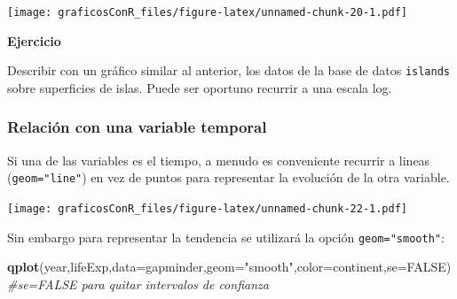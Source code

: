 \documentclass[]{article}
\newenvironment{Shaded}{\begin{snugshade}}{\end{snugshade}}
\newcommand{\CommentTok}[1]{\textcolor[rgb]{0.56,0.35,0.01}{\textit{#1}}}
\newcommand{\DataTypeTok}[1]{\textcolor[rgb]{0.13,0.29,0.53}{#1}}
\newcommand{\KeywordTok}[1]{\textcolor[rgb]{0.13,0.29,0.53}{\textbf{#1}}}
\newcommand{\NormalTok}[1]{#1}
\newcommand{\OperatorTok}[1]{\textcolor[rgb]{0.81,0.36,0.00}{\textbf{#1}}}
\newcommand{\OtherTok}[1]{\textcolor[rgb]{0.56,0.35,0.01}{#1}}
\newcommand{\StringTok}[1]{\textcolor[rgb]{0.31,0.60,0.02}{#1}}
\newcounter{ejcnt}[section]
\numberwithin{ejcnt}{section}
\newenvironment{ej}[1][]{%
	\refstepcounter{ejcnt}%
	\par\medskip%
	\noindent%
	\textbf{Ejercicio \theejcnt \;\;}%
	\rmfamily%
}{\medskip}
\begin{document}
\texttt{[image: graficosConR\_files/figure-latex/unnamed-chunk-20-1.pdf]}

\begin{ej}
Describir con un gráfico similar al anterior, los datos de la base de
datos \texttt{islands} sobre superficies de islas. Puede ser oportuno
recurrir a una escala log.
\end{ej}

\hypertarget{relacion-con-una-variable-temporal}{%
\subsubsection{Relación con una variable temporal}\label{relacion-con-una-variable-temporal}}

Si una de las variables es el tiempo, a menudo es conveniente recurrir a lineas (\texttt{geom="line"}) en vez de puntos para representar la evolución de la otra variable.

\begin{Shaded}
\end{Shaded}

\texttt{[image: graficosConR\_files/figure-latex/unnamed-chunk-22-1.pdf]}

Sin embargo para representar la tendencia se utilizará la opción \texttt{geom="smooth"}:

\begin{Shaded}
\begin{Highlighting}[]
\KeywordTok{qplot}\NormalTok{(year,lifeExp,}\DataTypeTok{data=}\NormalTok{gapminder,}\DataTypeTok{geom=}\StringTok{"smooth"}\NormalTok{,}\DataTypeTok{color=}\NormalTok{continent,}\DataTypeTok{se=}\OtherTok{FALSE}\NormalTok{) }\CommentTok{#se=FALSE para quitar intervalos de confianza}
\end{Highlighting}
\end{Shaded}
\end{document}
